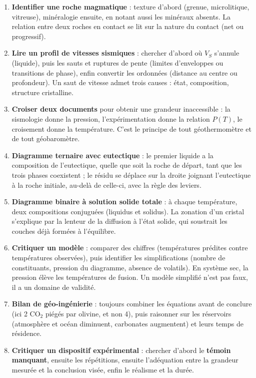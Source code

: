 \documentclass[11pt,a4paper]{article}
\providecommand{\tightlist}{\setlength{\itemsep}{0pt}\setlength{\parskip}{0pt}}
\begin{document}
\begin{enumerate}
\def\labelenumi{\arabic{enumi}.}
\tightlist
\item
  \textbf{Identifier une roche magmatique} : texture d'abord (grenue, microlitique, vitreuse), minéralogie ensuite, en notant aussi les minéraux absents. La relation entre deux roches en contact se lit sur la nature du contact (net ou progressif).
\item
  \textbf{Lire un profil de vitesses sismiques} : chercher d'abord où \(V_S\) s'annule (liquide), puis les sauts et ruptures de pente (limites d'enveloppes ou transitions de phase), enfin convertir les ordonnées (distance au centre ou profondeur). Un saut de vitesse admet trois causes : état, composition, structure cristalline.
\item
  \textbf{Croiser deux documents} pour obtenir une grandeur inaccessible : la sismologie donne la pression, l'expérimentation donne la relation \(P(T)\), le croisement donne la température. C'est le principe de tout géothermomètre et de tout géobaromètre.
\item
  \textbf{Diagramme ternaire avec eutectique} : le premier liquide a la composition de l'eutectique, quelle que soit la roche de départ, tant que les trois phases coexistent ; le résidu se déplace sur la droite joignant l'eutectique à la roche initiale, au-delà de celle-ci, avec la règle des leviers.
\item
  \textbf{Diagramme binaire à solution solide totale} : à chaque température, deux compositions conjuguées (liquidus et solidus). La zonation d'un cristal s'explique par la lenteur de la diffusion à l'état solide, qui soustrait les couches déjà formées à l'équilibre.
\item
  \textbf{Critiquer un modèle} : comparer des chiffres (températures prédites contre températures observées), puis identifier les simplifications (nombre de constituants, pression du diagramme, absence de volatils). En système sec, la pression élève les températures de fusion. Un modèle simplifié n'est pas faux, il a un domaine de validité.
\item
  \textbf{Bilan de géo-ingénierie} : toujours combiner les équations avant de conclure (ici 2 \(\mathrm{CO_2}\) piégés par olivine, et non 4), puis raisonner sur les réservoirs (atmosphère et océan diminuent, carbonates augmentent) et leurs temps de résidence.
\item
  \textbf{Critiquer un dispositif expérimental} : chercher d'abord le \textbf{témoin manquant}, ensuite les répétitions, ensuite l'adéquation entre la grandeur mesurée et la conclusion visée, enfin le réalisme et la durée.

\end{enumerate}
\end{document}
